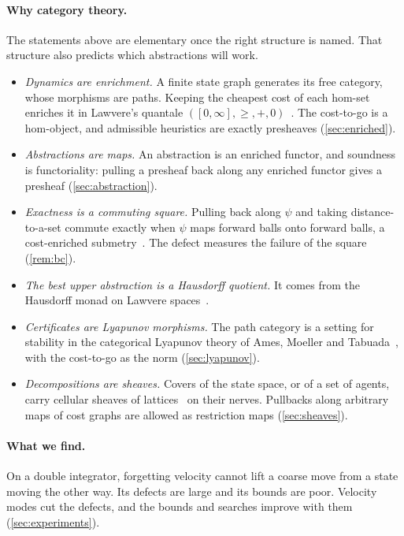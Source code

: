 \documentclass[11pt]{article}
\theoremstyle{definition}
\theoremstyle{remark}
\begin{document}
\paragraph{Why category theory.}
The statements above are elementary once the right structure is named. That
structure also predicts which abstractions will work.
\begin{itemize}
\item \emph{Dynamics are enrichment.} A finite state graph generates its free
  category, whose morphisms are paths. Keeping the cheapest cost of each hom-set
  enriches it in Lawvere's quantale $([0,\infty], \ge, +, 0)$~\cite{lawvere1973}.
  The cost-to-go is a hom-object, and admissible heuristics are exactly presheaves
  (\cref{sec:enriched}).
\item \emph{Abstractions are maps.} An abstraction is an enriched functor, and
  soundness is functoriality: pulling a presheaf back along any enriched functor
  gives a presheaf (\cref{sec:abstraction}).
\item \emph{Exactness is a commuting square.} Pulling back along $\psi$ and taking
  distance-to-a-set commute exactly when $\psi$ maps forward balls onto forward
  balls, a cost-enriched submetry~\cite{berestovskii2000}. The defect measures the
  failure of the square (\cref{rem:bc}).
\item \emph{The best upper abstraction is a Hausdorff quotient.} It comes from the
  Hausdorff monad on Lawvere spaces~\cite{akhvlediani2010}.
\item \emph{Certificates are Lyapunov morphisms.} The path category is a setting
  for stability in the categorical Lyapunov theory of Ames, Moeller and
  Tabuada~\cite{ames2025clt1}, with the cost-to-go as the norm
  (\cref{sec:lyapunov}).
\item \emph{Decompositions are sheaves.} Covers of the state space, or of a set of
  agents, carry cellular sheaves of lattices~\cite{curry2014,ghrist2022} on their
  nerves. Pullbacks along arbitrary maps of cost graphs are allowed as restriction
  maps (\cref{sec:sheaves}).
\end{itemize}

\paragraph{What we find.}
On a double integrator, forgetting velocity cannot lift a coarse move from a state
moving the other way. Its defects are large and its bounds are poor. Velocity
modes cut the defects, and the bounds and searches improve with them
(\cref{sec:experiments}).
\end{document}
